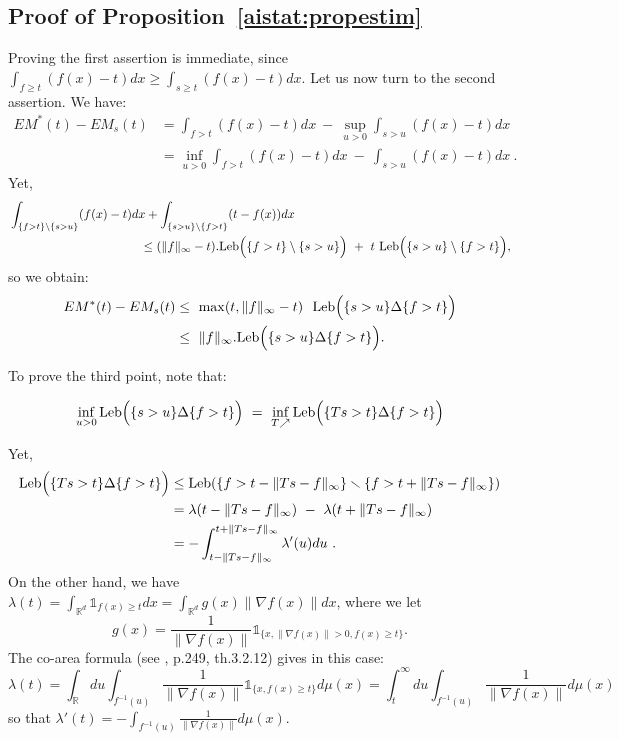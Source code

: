 \subsection*{Proof of Proposition~\ref{aistat:propestim}}
Proving the first assertion is immediate, since $\int_{f \ge t}(f(x)-t)dx \ge \int_{s \ge t}(f(x)-t)dx$.
Let us now turn to the second assertion. We have:
\begin{align*}
EM^*(t)-EM_s(t)&=\int_{f>t}(f(x)-t)dx~-~\sup_{u>0}\int_{s>u}(f(x)-t)dx\\
&=\inf_{u>0} \int_{f>t}(f(x)-t)dx     ~-~\int_{s>u}(f(x)-t)dx~.
\end{align*}
Yet,
\begin{align*}
&\int_{\{f>t\}\setminus\{s>u\}}(f(x)-t)dx + \int_{\{s>u\}\setminus\{f>t\}}(t-f(x))dx\\
&~~~~~~~~~~~~~~~~~~~~~~~~~~~~~~~~\le (\|f\|_\infty-t).\text{Leb}\Big(\{f>t\} \setminus \{s>u\}\Big)~+~ t~\text{Leb}\Big(\{s>u\} \setminus \{f>t\}\Big),
\end{align*}
 so we obtain:
\begin{align*}
EM^*(t)-EM_s(t)  &\le~ \max(t,\|f\|_\infty-t) ~~\text{Leb}\Big(\{s>u\} \Delta \{f>t\}\Big) \\
&\le~ \|f\|_\infty .\text{Leb}\Big(\{s>u\} \Delta \{f>t\}\Big) .
\end{align*}

\noindent To prove the third point, note that:

\begin{align*}
\inf_{u>0} \text{Leb}\Big(\{s>u\} \Delta \{f>t\}\Big)~=~\inf_{T \nearrow} \text{Leb}\Big(\{Ts>t\} \Delta \{f>t\}\Big)  
\end{align*}

Yet,
\begin{align*} 
\text{Leb}\Big(\{Ts> t\} \Delta \{f>t\}\Big) &\le{\text{Leb}(\{f>t-\|Ts-f\|_\infty\} \smallsetminus \{f>t+\|Ts-f\|_\infty\})}\\
&=\lambda(t-\|Ts-f\|_\infty)~-~\lambda(t+\|Ts-f\|_\infty)\\
&=-\int_{t-\|Ts-f\|_\infty}^{t+\|Ts-f\|_\infty}\lambda'(u)du ~.
\end{align*}
\noindent
On the other hand, we have $\lambda(t)=\int_{\mathbb{R}^d}\mathds{1}_{f(x)\ge t}dx = \int_{\mathbb{R}^d} g(x) \|\nabla f(x)\|dx$, where we let $$g(x) = \frac{1}{\|\nabla f(x)\|} \mathds{1}_{\{x,\|\nabla f(x)\|>0, f(x)\ge t\}}.$$ The co-area formula (see \cite{Federer1969}, p.249, th.3.2.12) gives in this case: $$\lambda(t)=\int_{\mathbb{R}} du \int_{f^{-1}(u)}\frac{1}{\|\nabla f(x)\|} \mathds{1}_{\{x,f(x)\ge t\}}d\mu (x) = \int_{t}^\infty du \int_{f^{-1}(u)}\frac{1}{\|\nabla f(x)\|}d\mu (x)$$ so that $\lambda'(t)=-\int_{f^{-1}(u)}\frac{1}{\|\nabla f(x)\|}d\mu (x)$.\\


